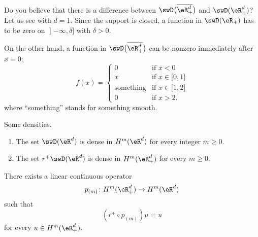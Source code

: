 \begin{normaltext}
Do you believe that there is a difference between \( \swD\big( \overline{ \eR^d_+ }\big)\) and \( \swD(\eR^d_+)\)? Let us see with \( d=1\). Since the support is closed, a function in \( \swD(\eR_+)\) has to be zero on \( \mathopen] -\infty , \delta \mathclose]\) with \( \delta>0\).

On the other hand, a function in \( \swD\big( \overline{ \eR^d_+ } \big)\) can be nonzero immediately after \( x=0\):
\begin{equation}
    f(x)=\begin{cases}
        0    &   \text{if } x<0\\
        x    &    \text{if  } x\in\mathopen[ 0 , 1 \mathclose]\\
        \text{something}    &    \text{if } x\in \mathopen[ 1 , 2 \mathclose]\\
        0    &   \text{if } x>2.
    \end{cases}
\end{equation}
where ``something'' stands for something smooth.
\end{normaltext}

\begin{proposition}      \label{PROPooCXYRooPTgSLX}
    Some densities.
    \begin{enumerate}
        \item
            The set \( \swD(\eR^d)\) is dense in \( H^m(\eR^d)\) for every integer \( m\geq 0\).
        \item
            The set \( r^+\swD(\eR^d)\) is dense in \( H^m(\eR^d_+)\) for every \( m\geq 0\).
    \end{enumerate}
\end{proposition}

\begin{theorem}
    There exists a linear continuous operator
    \begin{equation}
        p_{(m)}\colon H^m(\eR^d_+)\to H^m(\eR^d)
    \end{equation}
    such that
    \begin{equation}
        (r^+\circ p_{(m)})u=u
    \end{equation}
    for every \( u\in H^m(\eR^d_+)\).
\end{theorem}

